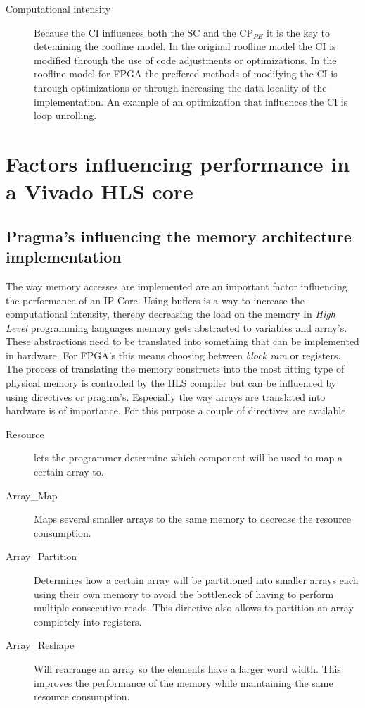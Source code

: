 \begin{description}
	\item[Computational intensity] Because the CI influences both the SC and the CP$_{PE}$ it is the key to detemining the roofline model. In the original roofline model the CI is modified through the use of code adjustments or optimizations. In the roofline model for FPGA the preffered methods of modifying the CI is through optimizations or through increasing the data locality of the implementation. An example of an optimization that influences the CI is loop unrolling.

\end{description}

\section{Factors influencing performance in a Vivado HLS core}

\subsection{Pragma's influencing the memory architecture implementation}

The way memory accesses are implemented are an important factor influencing the performance of an IP-Core. Using buffers is a way to increase the computational intensity, thereby decreasing the load on the memory 
In \emph{High Level} programming languages memory gets abstracted to variables and array's. These abstractions need to be translated into something that can be implemented in hardware. For FPGA's this means choosing between \emph{block ram} or registers. The process of translating the memory constructs into the most fitting type of physical memory is controlled by the HLS compiler but can be influenced by using directives or pragma's. Especially the way arrays are translated into hardware is of importance. For this purpose a couple of directives are available.\\

\begin{description}

\item[Resource] lets the programmer determine which component will be used to map a certain array to.

\item[Array\_Map] Maps several smaller arrays to the same memory to decrease the resource consumption.

\item[Array\_Partition] Determines how a certain array will be partitioned into smaller arrays each using their own memory to avoid the bottleneck of having to perform multiple consecutive reads. This directive also allows to partition an array completely into registers.

\item[Array\_Reshape] Will rearrange an array so the elements have a larger word width. This improves the performance of the memory while maintaining the same resource consumption.

\end{description}

